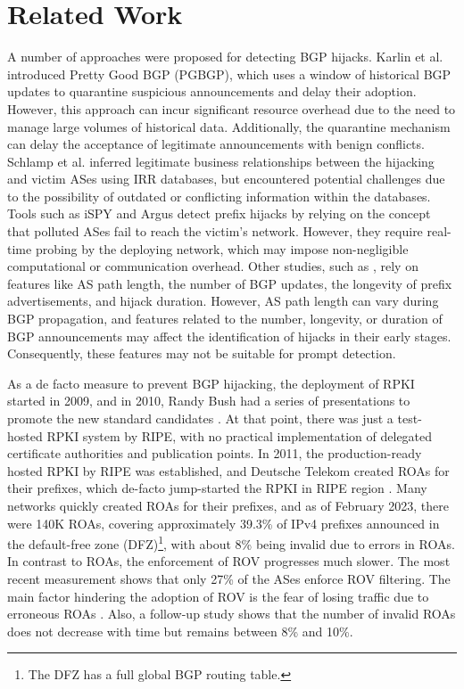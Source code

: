 \vspace{-10pt}
\section{Related Work} \label{sec:relatedwork}
A number of approaches were proposed for detecting BGP hijacks.
Karlin et al. \cite{karlin2006pretty} introduced Pretty Good BGP (PGBGP), which uses a window of historical BGP updates to quarantine suspicious announcements and delay their adoption. However, this approach can incur significant resource overhead due to the need to manage large volumes of historical data. Additionally, the quarantine mechanism can delay the acceptance of legitimate announcements with benign conflicts.
Schlamp et al. \cite{schlamp2016heap} inferred legitimate business relationships between the hijacking and victim ASes using IRR databases, but encountered potential challenges due to the possibility of outdated or conflicting information within the databases. Tools such as iSPY \cite{zhang2008ispy} and Argus \cite{shi2012detecting} detect prefix hijacks by relying on the concept that polluted ASes fail to reach the victim's network. However, they require real-time probing by the deploying network, which may impose non-negligible computational or communication overhead.
Other studies, such as \cite{deshpande2009online, karimi2019border, testart2019profiling, hlavacek2022smart}, rely on features like AS path length, the number of BGP updates, the longevity of prefix advertisements, and hijack duration. However, AS path length can vary during BGP propagation, and features related to the number, longevity, or duration of BGP announcements may affect the identification of hijacks in their early stages. Consequently, these features may not be suitable for prompt detection.

As a de facto measure to prevent BGP hijacking, the deployment of RPKI started in 2009, and in 2010, Randy Bush had a series of presentations to promote the new standard candidates \cite{bush:rpki:2009}. At that point, there was just a test-hosted RPKI system by RIPE, with no practical implementation of delegated certificate authorities and publication points. In 2011, the production-ready hosted RPKI by RIPE was established, and Deutsche Telekom created ROAs for their prefixes, which de-facto jump-started the RPKI in RIPE region \cite{band:rpki:2011}. Many networks quickly created ROAs for their prefixes, and as of February 2023, there were 140K ROAs, covering approximately 39.3\% of IPv4 prefixes announced in the default-free zone (DFZ)\footnote{The DFZ has a full global BGP routing table.}, with about 8\% being invalid due to errors in ROAs. In contrast to ROAs, the enforcement of ROV progresses much slower. The most recent measurement \cite{hlavacek2022behind} shows that only 27\% of the ASes enforce ROV filtering. The main factor hindering the adoption of ROV is the fear of losing traffic due to erroneous ROAs \cite{gilad2017we,iamartino2015measuring, wahlisch2012towards}. Also, a follow-up study \cite{chung2019rpki} shows that the number of invalid ROAs does not decrease with time but remains between 8\% and 10\%.

